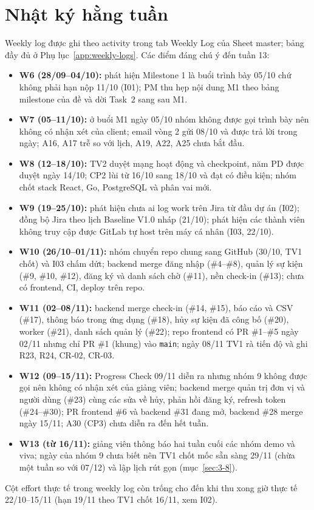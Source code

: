 
\section{Nhật ký hằng tuần}
\label{sec:3-2}
Weekly log được ghi theo activity trong tab Weekly Log của Sheet master; bảng đầy đủ ở Phụ lục~\ref{app:weekly-logs}. Các điểm đáng chú ý đến tuần 13:
\begin{itemize}
  \item \textbf{W6 (28/09--04/10):} phát hiện Milestone 1 là buổi trình bày 05/10 chứ không phải hạn nộp 11/10 (I01); PM thu hẹp nội dung M1 theo bảng milestone của đề và dời Task~2 sang sau M1.
  \item \textbf{W7 (05--11/10):} ở buổi M1 ngày 05/10 nhóm không được gọi trình bày nên không có nhận xét của client; email vòng 2 gửi 08/10 và được trả lời trong ngày; A16, A17 trễ so với lịch, A19, A22, A25 chưa bắt đầu.
  \item \textbf{W8 (12--18/10):} TV2 duyệt mạng hoạt động và checkpoint, năm PD được duyệt ngày 14/10; CP2 lùi từ 16/10 sang 18/10 và đạt có điều kiện; nhóm chốt stack React, Go, PostgreSQL và phân vai mới.
  \item \textbf{W9 (19--25/10):} phát hiện chưa ai log work trên Jira từ đầu dự án (I02); đồng bộ Jira theo lịch Baseline V1.0 nháp (21/10); phát hiện các thành viên không truy cập được GitLab tự host trên máy cá nhân (I03, 22/10).
  \item \textbf{W10 (26/10--01/11):} nhóm chuyển repo chung sang GitHub (30/10, TV1 chốt) và I03 chấm dứt; backend merge đăng nhập (\#4--\#8), quản lý sự kiện (\#9, \#10, \#12), đăng ký và danh sách chờ (\#11), nền check-in (\#13); chưa có frontend, CI, deploy trên repo.
  \item \textbf{W11 (02--08/11):} backend merge check-in (\#14, \#15), báo cáo và CSV (\#17), thông báo trong ứng dụng (\#18), hủy sự kiện đã công bố (\#20), worker (\#21), danh sách quản lý (\#22); repo frontend có PR \#1--\#5 ngày 02/11 nhưng chỉ PR \#1 (khung) vào \texttt{main}; ngày 08/11 TV1 rà tiến độ và ghi R23, R24, CR-02, CR-03.
  \item \textbf{W12 (09--15/11):} Progress Check 09/11 diễn ra nhưng nhóm 9 không được gọi nên không có nhận xét của giảng viên; backend merge quản trị đơn vị và người dùng (\#23) cùng các sửa về hủy, phản hồi đăng ký, refresh token (\#24--\#30); PR frontend \#6 và backend \#31 đang mở, backend \#28 merge ngày 15/11; A30 (CP3) chưa diễn ra đến hết tuần.
  \item \textbf{W13 (từ 16/11):} giảng viên thông báo hai tuần cuối các nhóm demo và viva; ngày của nhóm 9 chưa biết nên TV1 chốt mốc sẵn sàng 29/11 (chừa một tuần so với 07/12) và lập lịch rút gọn (mục~\ref{sec:3-8}).
\end{itemize}
Cột effort thực tế trong weekly log còn trống cho đến khi thu xong giờ thực tế 22/10--15/11 (hạn 19/11 theo TV1 chốt 16/11, xem I02).

